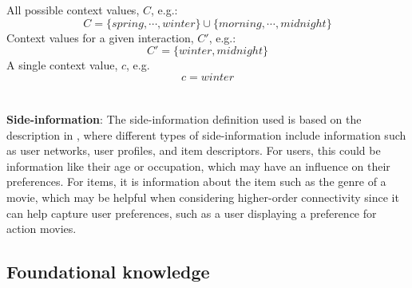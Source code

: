All possible context values, $C$, e.g.:
$$C = \{spring, \cdots, winter\} \cup \{morning, \cdots, midnight\}$$
Context values for a given interaction, $C'$, e.g.:
$$C' = \{winter, midnight\}$$
A single context value, $c$, e.g. 
$$c = winter$$
\\\\
\textbf{Side-information}:
The side-information definition used is based on the description in \cite{SideInfoDefinition}, where different types of side-information include information such as user networks, user profiles, and item descriptors.
For users, this could be information like their age or occupation, which may have an influence on their preferences.
For items, it is information about the item such as the genre of a movie, which may be helpful when considering higher-order connectivity since it can help capture user preferences, such as a user displaying a preference for action movies.


\subsection{Foundational knowledge}\label{sec:foundational_knowledge}
